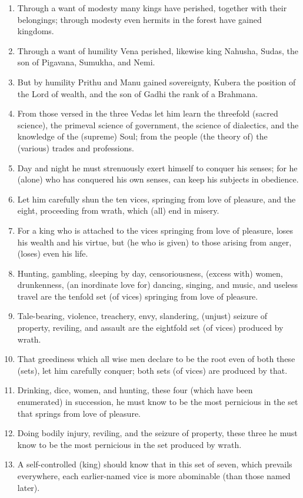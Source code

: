 \begin{enumerate}
\item Through a want of modesty many kings have perished, together with their belongings; through modesty even hermits in the forest have gained kingdoms.
\item Through a want of humility Vena perished, likewise king Nahusha, Sudas, the son of Pigavana, Sumukha, and Nemi.
\item But by humility Prithu and Manu gained sovereignty, Kubera the position of the Lord of wealth, and the son of Gadhi the rank of a Brahmana.
\item From those versed in the three Vedas let him learn the threefold (sacred science), the primeval science of government, the science of dialectics, and the knowledge of the (supreme) Soul; from the people (the theory of) the (various) trades and professions.
\item Day and night he must strenuously exert himself to conquer his senses; for he (alone) who has conquered his own senses, can keep his subjects in obedience.
\item Let him carefully shun the ten vices, springing from love of pleasure, and the eight, proceeding from wrath, which (all) end in misery.
\item For a king who is attached to the vices springing from love of pleasure, loses his wealth and his virtue, but (he who is given) to those arising from anger, (loses) even his life.
\item Hunting, gambling, sleeping by day, censoriousness, (excess with) women, drunkenness, (an inordinate love for) dancing, singing, and music, and useless travel are the tenfold set (of vices) springing from love of pleasure.
\item Tale-bearing, violence, treachery, envy, slandering, (unjust) seizure of property, reviling, and assault are the eightfold set (of vices) produced by wrath.
\item That greediness which all wise men declare to be the root even of both these (sets), let him carefully conquer; both sets (of vices) are produced by that.
\item Drinking, dice, women, and hunting, these four (which have been enumerated) in succession, he must know to be the most pernicious in the set that springs from love of pleasure.
\item Doing bodily injury, reviling, and the seizure of property, these three he must know to be the most pernicious in the set produced by wrath.
\item A self-controlled (king) should know that in this set of seven, which prevails everywhere, each earlier-named vice is more abominable (than those named later).

\end{enumerate}
